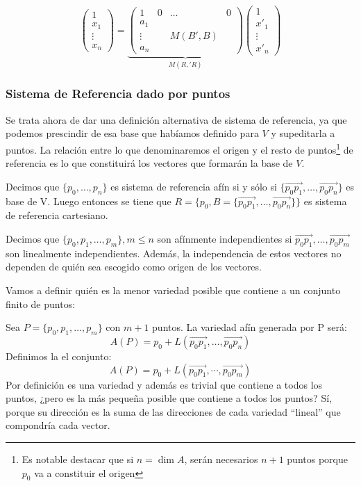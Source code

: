 \documentclass[10pt,a4paper,openright]{book}
\theoremstyle{break}
\begin{document}
$$\begin{pmatrix}
1 \\ x_1 \\ \vdots \\ x_n
\end{pmatrix} = \underbrace{\left(\begin{array}{c|ccc}
1  & 0 & \ldots & 0 \\
\hline
a_1  &  & & \\
\vdots &  & M(B',B)& \\
a_n & & &
\end{array}
\right)}_{M(R,'R)} \begin{pmatrix}
1 \\ x'_1 \\ \vdots \\ x'_n
\end{pmatrix}$$

\subsubsection*{Sistema de Referencia dado por puntos}
Se trata ahora de dar una definición alternativa de sistema de referencia, ya que podemos prescindir de esa base que habíamos definido para $V$ y supeditarla a puntos. La relación entre lo que denominaremos el origen y el resto de puntos\footnote{Es notable destacar que si $n= \dim A$, serán necesarios $n+1$ puntos porque $p_0$ va a constituir el origen} de referencia es lo que constituirá los vectores que formarán la base de $V$.

Decimos que $\{p_0, \ldots, p_n\}$ es sistema de referencia afín si y sólo si $\{\vec{p_0 p_1}, \ldots, \vec{p_0 p_n}\}$ es base de V. Luego entonces se tiene que $R=\{p_0, B=\{\vec{p_0 p_1}, \ldots, \vec{p_0 p_n}\}\}$ es sistema de referencia cartesiano.

Decimos que $\{p_0, p_1, \ldots, p_m\}, m \leq n$ son afínmente independientes si $\vec{p_0 p_1}, \ldots, \vec{p_0 p_m}$ son linealmente independientes. Además, la independencia de estos vectores no dependen de quién sea escogido como origen de los vectores.


Vamos a definir quién es la menor variedad posible que contiene a un conjunto finito de puntos:

Sea $P = \{p_0, p_1, \ldots, p_m\}$ con $m+1$ puntos. La variedad afín generada por P será:
$$A(P)=p_0 + L(\vec{p_0 p_1}, \ldots, \vec{p_0 p_n})$$
Definimos la el conjunto:
$$A(P)=p_0 + L(\vec{p_0p_1}, \cdots, \vec{p_0p_m})$$
Por definición es una variedad y además es trivial que contiene a todos los puntos, ¿pero es la más pequeña posible que contiene a todos los puntos? Sí, porque su dirección es la suma de las direcciones de cada variedad ``lineal'' que compondría cada vector.
\end{document}
